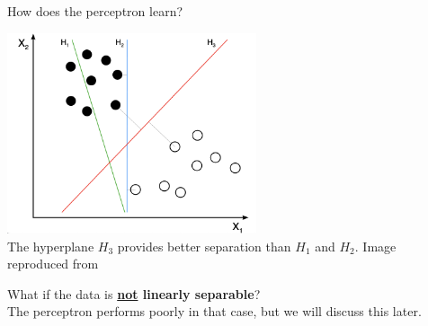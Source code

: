 \begin{frame}[t]{How does the perceptron learn?}
    
    \begin{center}
        \includegraphics[width=0.55\textwidth]{./images/perceptron/data_linearly_separable.png}\\
        {\scriptsize 
        The hyperplane $H_3$ provides better separation than $H_1$ and $H_2$.
        \color{col:attribution} 
        Image reproduced from \cite{Wikipedia:LinearSeparability}}\\
    \end{center}
    \vspace{0.2cm}
    What if the data is {\bf \underline{not} linearly separable}?\\
    The \gls{perceptron} performs poorly in that case, but we will discuss this later.\\

\end{frame}



%
%
%

